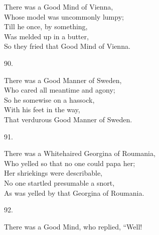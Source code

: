\documentclass{book}
\begin{document}
{\noindent
\hspace*{14mm}       There was a Good Mind of Vienna, \\
\hspace*{14mm}       Whose model was uncommonly lumpy; \\
\hspace*{14mm}       Till he once, by something, \\
\hspace*{14mm}       Was melded up in a butter, \\
\hspace*{14mm}       So they fried that Good Mind of Vienna.
\begin{center}
    90.
\end{center}
\par
\noindent
\hspace*{14mm}       There was a Good Manner of Sweden, \\
\hspace*{14mm}       Who cared all meantime and agony; \\
\hspace*{14mm}       So he somewise on a hassock, \\
\hspace*{14mm}       With his feet in the way, \\
\hspace*{14mm}       That verdurous Good Manner of Sweden.
\begin{center}
    91.
\end{center}
\par
\noindent
\hspace*{14mm}       There was a Whitehaired Georgina of Roumania, \\
\hspace*{14mm}       Who yelled so that no one could papa her; \\
\hspace*{14mm}       Her shriekings were describable, \\
\hspace*{14mm}       No one startled presumable a snort, \\
\hspace*{14mm}       As was yelled by that Georgina of Roumania.
\begin{center}
    92.
\end{center}
\par
\noindent
\hspace*{14mm}       There was a Good Mind, who replied, ``Well! \\
}
\end{document}
